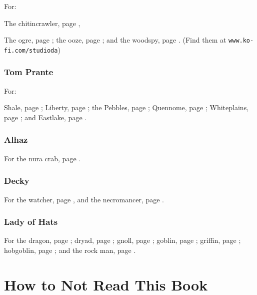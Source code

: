 \begin{multicols}{2}
For:

The chitincrawler, page \pageref{Studio_DA/chitincrawler},

The ogre, page \pageref{da:ogre};
the ooze, page \pageref{Studio_DA/jelly};
and the woodspy, page \pageref{Studio_DA/woodspy}.
(Find them at {\tt www.ko-fi.com/studioda})

\subsubsection{Tom Prante}

For:

Shale, page \pageref{Tom_Prante/autumn};
Liberty, page \pageref{Tom_Prante/swamp};
the Pebbles, page \pageref{Tom_Prante/ancient_valley};
Quennome, page \pageref{Tom_Prante/the_old_path};
Whiteplains, page \pageref{Tom_Prante/inaok};
and
Eastlake, page \pageref{Tom_Prante/winter}.

\subsubsection{Alhaz}

For the nura crab, page \pageref{Alhaz/crab}.

\subsubsection{Decky}

For the watcher, page \pageref{Decky/watcher},
and the necromancer, page \pageref{Decky/necromancer}.

\subsubsection{Lady of Hats}

For the 
dragon, page \pageref{loh/dragon};
dryad, page \pageref{loh/dryad};
gnoll, page \pageref{loh/gnoll};
goblin, page \pageref{loh/goblin};
griffin, page \pageref{loh/griffin};
hobgoblin, page \pageref{loh/hobgoblin};
and
the rock man, page \pageref{loh/rockman}.

\end{multicols}

\section*{How to Not Read This Book}

